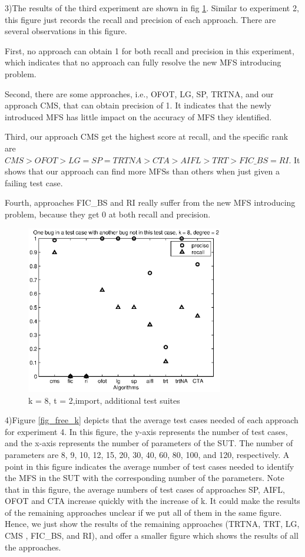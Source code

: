 \documentclass{sig-alternate-05-2015}
\begin{document}
{{3)The results of the third experiment are shown in fig \ref{fig_import}. Similar to experiment 2, this figure just records the recall and precision of each approach. There are several observations in this figure.

First, no approach can obtain 1 for both recall and precision in this experiment, which indicates that no approach can fully resolve the new MFS introducing problem.

Second, there are some approaches, i.e., OFOT, LG, SP, TRTNA, and our approach CMS, that can obtain precision of 1. It indicates that the newly introduced MFS has little impact on the accuracy of MFS they identified.

Third, our approach CMS get the highest score at recall, and the specific rank are $CMS > OFOT > LG = SP = TRTNA > CTA > AIFL > TRT > FIC\_BS = RI$. It shows that our approach can find more MFSs than others when just given a failing test case.

Fourth, approaches FIC\_BS and RI really suffer from the new MFS introducing problem, because they get 0 at both recall and precision.

\begin{figure}
 \centering
 \includegraphics[width=3.4in]{i-8-2.eps}
 \caption{k = 8, t = 2,import, additional test suites}
 \label{fig_import}
\end{figure}

4)Figure \ref{fig_free_k} depicts that the average test cases needed of each approach for experiment 4. In this figure, the y-axis represents the number of test cases, and the x-axis represents the number of parameters of the SUT. The number of parameters are 8, 9, 10, 12, 15, 20, 30, 40, 60, 80, 100, and 120, respectively.  A point in this figure indicates the average number of test cases needed to identify the MFS in the SUT with the corresponding number of the parameters. Note that in this figure, the average numbers of test cases of approaches SP, AIFL, OFOT and CTA increase quickly with the increase of k. It could make the results of the remaining approaches unclear if we put all of them in the same figure. Hence, we just show the results of the remaining approaches (TRTNA, TRT, LG, CMS , FIC\_BS, and RI), and offer a smaller figure  which shows the results of all the approaches.

}}
\end{document}
